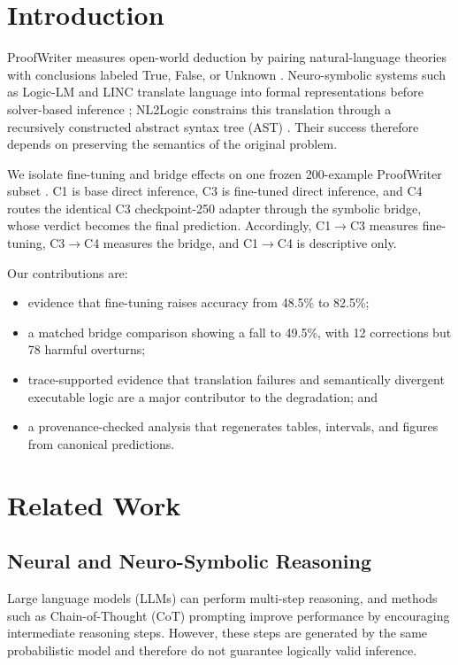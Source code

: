 \documentclass[conference]{IEEEtran}
\begin{document}
\section{Introduction}

ProofWriter measures open-world deduction by pairing natural-language theories with conclusions labeled True, False, or Unknown \cite{proofwriter}. Neuro-symbolic systems such as Logic-LM and LINC translate language into formal representations before solver-based inference \cite{logiclm,linc}; NL2Logic constrains this translation through a recursively constructed abstract syntax tree (AST) \cite{nl2logic}. Their success therefore depends on preserving the semantics of the original problem.

We isolate fine-tuning and bridge effects on one frozen 200-example ProofWriter subset \cite{proofwriter}. C1 is base direct inference, C3 is fine-tuned direct inference, and C4 routes the identical C3 checkpoint-250 adapter through the symbolic bridge, whose verdict becomes the final prediction. Accordingly, C1$\rightarrow$C3 measures fine-tuning, C3$\rightarrow$C4 measures the bridge, and C1$\rightarrow$C4 is descriptive only.

Our contributions are:
\begin{itemize}
    \item evidence that fine-tuning raises accuracy from 48.5\% to 82.5\%;
    \item a matched bridge comparison showing a fall to 49.5\%, with 12 corrections but 78 harmful overturns;
    \item trace-supported evidence that translation failures and semantically divergent executable logic are a major contributor to the degradation; and
    \item a provenance-checked analysis that regenerates tables, intervals, and figures from canonical predictions.
\end{itemize}

\section{Related Work}

\subsection{Neural and Neuro-Symbolic Reasoning}

Large language models (LLMs) can perform multi-step reasoning, and methods such as Chain-of-Thought (CoT) prompting \cite{cot} improve performance by encouraging intermediate reasoning steps. However, these steps are generated by the same probabilistic model and therefore do not guarantee logically valid inference.
\end{document}
